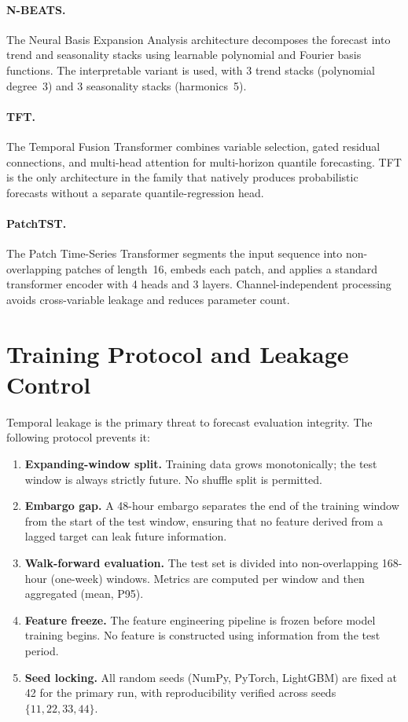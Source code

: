 \paragraph{N-BEATS.}
The Neural Basis Expansion Analysis architecture decomposes the forecast
into trend and seasonality stacks using learnable polynomial and Fourier
basis functions.  The interpretable variant is used, with 3 trend stacks
(polynomial degree~3) and 3 seasonality stacks (harmonics~5).

\paragraph{TFT.}
The Temporal Fusion Transformer combines variable selection, gated residual
connections, and multi-head attention for multi-horizon quantile forecasting.
TFT is the only architecture in the family that natively produces
probabilistic forecasts without a separate quantile-regression head.

\paragraph{PatchTST.}
The Patch Time-Series Transformer segments the input sequence into
non-overlapping patches of length~16, embeds each patch, and applies a
standard transformer encoder with 4 heads and 3 layers.
Channel-independent processing avoids cross-variable leakage and reduces
parameter count.

\section{Training Protocol and Leakage Control}
\label{sec:training-protocol}

Temporal leakage is the primary threat to forecast evaluation integrity.
The following protocol prevents it:

\begin{enumerate}
  \item \textbf{Expanding-window split.}  Training data grows monotonically;
    the test window is always strictly future.  No shuffle split is permitted.
  \item \textbf{Embargo gap.}  A 48-hour embargo separates the end of the
    training window from the start of the test window, ensuring that no
    feature derived from a lagged target can leak future information.
  \item \textbf{Walk-forward evaluation.}  The test set is divided into
    non-overlapping 168-hour (one-week) windows.  Metrics are computed per
    window and then aggregated (mean, P95).
  \item \textbf{Feature freeze.}  The feature engineering pipeline is frozen
    before model training begins.  No feature is constructed using information
    from the test period.
  \item \textbf{Seed locking.}  All random seeds (NumPy, PyTorch, LightGBM)
    are fixed at 42 for the primary run, with reproducibility verified across
    seeds $\{11, 22, 33, 44\}$.
\end{enumerate}

